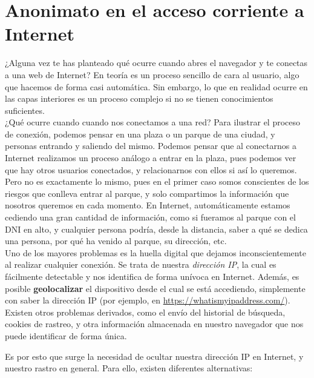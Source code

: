 	\section{Anonimato en el acceso corriente a Internet}
	¿Alguna vez te has planteado qué ocurre cuando abres el navegador y te conectas a una web de Internet? En teoría es un proceso sencillo de cara al usuario, algo que hacemos de forma casi automática. Sin embargo, lo que en realidad ocurre en las capas interiores es un proceso complejo si no se tienen conocimientos suficientes.\\
	
	¿Qué ocurre cuando cuando nos conectamos a una red? Para ilustrar el proceso de conexión, podemos pensar en una plaza o un parque de una ciudad, y personas entrando y saliendo del mismo. Podemos pensar que al conectarnos a Internet realizamos un proceso análogo a entrar en la plaza, pues podemos ver que hay otros usuarios conectados, y relacionarnos con ellos si así lo queremos. Pero no es exactamente lo mismo, pues en el primer caso somos conscientes de los riesgos que conlleva entrar al parque, y solo compartimos la información que nosotros queremos en cada momento. En Internet, automáticamente estamos cediendo una gran cantidad de información, como si fueramos al parque con el DNI en alto, y cualquier persona podría, desde la distancia, saber a qué se dedica una persona, por qué ha venido al parque, su dirección, etc.\\
	
	Uno de los mayores problemas es la huella digital que dejamos inconscientemente al realizar cualquier conexión. Se trata de nuestra \textit{dirección IP}, la cual es fácilmente detectable y nos identifica de forma unívoca en Internet. Además, es posible \textbf{geolocalizar} el dispositivo desde el cual se está accediendo, simplemente con saber la dirección IP (por ejemplo, en \url{https://whatismyipaddress.com/}).\\
	
	Existen otros problemas derivados, como el envío del historial de búsqueda, cookies de rastreo, y otra información almacenada en nuestro navegador que nos puede identificar de forma única.
	
	Es por esto que surge la necesidad de ocultar nuestra dirección IP en Internet, y nuestro rastro en general. Para ello, existen diferentes alternativas:
	
